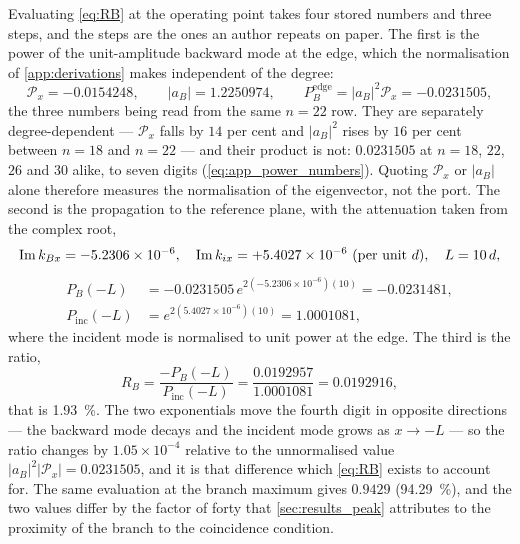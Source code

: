 Evaluating \eqref{eq:RB} at the operating point takes four stored numbers and
three steps, and the steps are the ones an author repeats on paper.  The first is
the power of the unit-amplitude backward mode at the edge, which the
normalisation of \cref{app:derivations} makes independent of the degree:
\begin{equation}
\label{eq:RB_worked}
\mathcal{P}_x=-0.0154248,\qquad |a_B|=1.2250974,\qquad
P_{B}^{\text{edge}}=|a_B|^{2}\mathcal{P}_x=-0.0231505 ,
\end{equation}
the three numbers being read from the same $n=22$ row.  They are separately
degree-dependent --- $\mathcal{P}_x$ falls by $14$ per cent and $|a_B|^{2}$ rises
by $16$ per cent between $n=18$ and $n=22$ --- and their product is not:
$0.0231505$ at $n=18$, $22$, $26$ and $30$ alike, to seven digits
(\eqref{eq:app_power_numbers}).  Quoting $\mathcal{P}_x$ or $|a_B|$ alone
therefore measures the normalisation of the eigenvector, not the port.
The second is the propagation to the reference plane, with the attenuation taken
from the complex root,
\begin{equation}
\label{eq:RB_prop}
\operatorname{Im} k_{Bx}=-5.2306\times10^{-6},\quad
\operatorname{Im} k_{ix}=+5.4027\times10^{-6}\ \text{(per unit $d$)},\quad L=10\,d ,
\end{equation}
\begin{equation}
\label{eq:RB_planes}
\begin{aligned}
P_{B}(-L)&=-0.0231505\,e^{2(-5.2306\times10^{-6})(10)}=-0.0231481,\\
P_{\text{inc}}(-L)&=e^{2(5.4027\times10^{-6})(10)}=1.0001081 ,
\end{aligned}
\end{equation}
where the incident mode is normalised to unit power at the edge.  The third is
the ratio,
\begin{equation}
\label{eq:RB_value}
R_B=\frac{-P_{B}(-L)}{P_{\text{inc}}(-L)}
=\frac{0.0192957}{1.0001081}=0.0192916 ,
\end{equation}
that is \SI{1.93}{\percent}.  The two exponentials move the fourth digit in
opposite directions --- the backward mode decays and the incident mode grows as
$x\to-L$ --- so the ratio changes by $1.05\times10^{-4}$ relative to the
unnormalised value $|a_B|^{2}|\mathcal{P}_x|=0.0231505$, and it is that
difference which \eqref{eq:RB} exists to account for.  The same evaluation at the
branch maximum gives $0.9429$ (\SI{94.29}{\percent}), and the two values differ
by the factor of forty that \cref{sec:results_peak} attributes to the proximity
of the branch to the coincidence condition.

